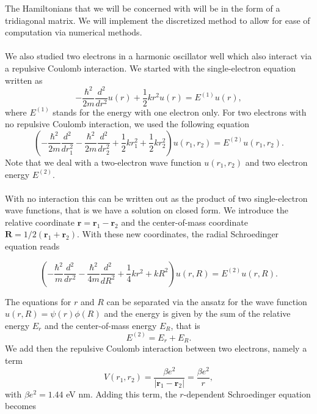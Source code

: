 \documentclass{article}
\begin{document}
The Hamiltonians that we will be concerned with will be in the form of a tridiagonal matrix. We will implement the discretized method to allow for ease of computation via numerical methods.\\
\\
We also studied two electrons in a harmonic oscillator well which also interact via a repulsive Coulomb interaction. We started with the single-electron equation written as
\begin{equation*}
  -\frac{\hbar^2}{2 m} \frac{d^2}{dr^2} u(r) 
       + \frac{1}{2}k r^2u(r)  = E^{(1)} u(r),
\end{equation*}
where $E^{(1)}$ stands for the energy with one electron only. For two electrons with no repulsive Coulomb interaction, we used the following equation
\begin{equation*}
\left(  -\frac{\hbar^2}{2 m} \frac{d^2}{dr_1^2} -\frac{\hbar^2}{2 m} \frac{d^2}{dr_2^2}+ \frac{1}{2}k r_1^2+ \frac{1}{2}k r_2^2\right)u(r_1,r_2)  = E^{(2)} u(r_1,r_2) .
\end{equation*}
Note that we deal with a two-electron wave function $u(r_1,r_2)$ and two electron energy $E^{(2)}$.\\
\\
With no interaction this can be written out as the product of two single-electron wave functions, that is we have a solution on closed form. We introduce the relative coordinate $\mathbf{r} = \mathbf{r}_1-\mathbf{r}_2$
and the center-of-mass coordinate $\mathbf{R} = 1/2(\mathbf{r}_1+\mathbf{r}_2)$. With these new coordinates, the radial Schroedinger equation reads

\begin{equation*}
\left(  -\frac{\hbar^2}{m} \frac{d^2}{dr^2} -\frac{\hbar^2}{4 m} \frac{d^2}{dR^2}+ \frac{1}{4} k r^2+  kR^2\right)u(r,R)  = E^{(2)} u(r,R).
\end{equation*}

The equations for $r$ and $R$ can be separated via the ansatz for the wave function $u(r,R) = \psi(r)\phi(R)$ and the energy is given by the sum of the relative energy $E_r$ and the center-of-mass energy $E_R$, that is
\begin{equation*}
E^{(2)}=E_r+E_R.
\end{equation*}
We add then the repulsive Coulomb interaction between two electrons, namely a term
\begin{equation*}
V(r_1,r_2) = \frac{\beta e^2}{|\mathbf{r}_1-\mathbf{r}_2|}=\frac{\beta e^2}{r},
\end{equation*}
with $\beta e^2=1.44$ eV nm. Adding this term, the $r$-dependent Schroedinger equation becomes
\end{document}
